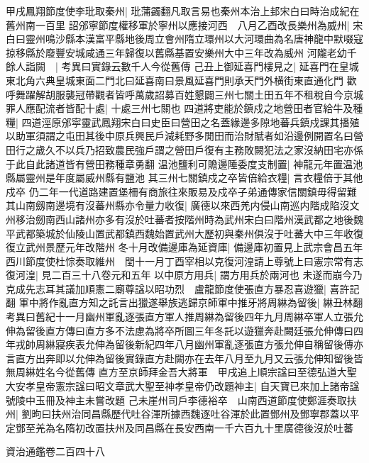 甲戌鳳翔節度使李玭取秦州|{
	玭蒲蠲翻凡取言易也秦州本治上邽宋白曰時治成紀在舊州南一百里}
詔邠寧節度權移軍於寧州以應接河西　八月乙酉改長樂州為威州|{
	宋白曰靈州鳴沙縣本漢富平縣地後周立會州隋立環州以大河環曲為名唐神龍中默啜寇掠移縣於廢豐安城咸通三年歸復以舊縣基置安樂州大中三年改為威州}
河隴老幼千餘人詣闕　|{
	考異曰實錄云數千人今從舊傳}
己丑上御延喜門樓見之|{
	延喜門在皇城東北角六典皇城東面二門北曰延喜南曰景風延喜門則承天門外横街東直通化門}
歡呼舞躍解胡服襲冠帶觀者皆呼萬歲詔募百姓懇闢三州七關土田五年不租稅自今京城罪人應配流者皆配十處|{
	十處三州七關也}
四道將吏能於鎮戍之地營田者官給牛及種糧|{
	四道涇原邠寜靈武鳳翔宋白曰史臣曰營田之名蓋緣邊多隙地蕃兵鎮戍課其播殖以助軍須謂之屯田其後中原兵興民戶減耗野多閒田而治財賦者如沿邊例開置名曰營田行之歲久不以兵乃招致農民強戶謂之營田戶復有主務敗闕犯法之家沒納田宅亦係于此自此諸道皆有營田務種章勇翻}
温池鹽利可贍邊陲委度支制置|{
	神龍元年置温池縣屬靈州是年度屬威州縣有鹽池}
其三州七關鎮戍之卒皆倍給衣糧|{
	言衣糧倍于其他戍卒}
仍二年一代道路建置堡柵有商旅往來販易及戍卒子弟通傳家信關鎮毋得留難其山南劔南邊境有沒蕃州縣亦令量力收復|{
	廣德以來西羌内侵山南巡内階成陷沒文州移治劒南西山諸州亦多有沒於吐蕃者按階州時為武州宋白曰階州漢武都之地後魏平武都築城於仙陵山置武都鎮西魏始置武州大歷初與秦州俱沒于吐蕃大中三年收復復立武州景歷元年改階州}
冬十月改備邊庫為延資庫|{
	備邊庫初置見上武宗會昌五年}
西川節度使杜悰奏取維州　閏十一月丁酉宰相以克復河湟請上尊號上曰憲宗常有志復河湟|{
	見二百三十八卷元和五年}
以中原方用兵|{
	謂方用兵於兩河也}
未遂而崩今乃克成先志耳其議加順憲二廟尊諡以昭功烈　盧龍節度使張直方暴忍喜遊獵|{
	喜許記翻}
軍中將作亂直方知之託言出獵遂舉族逃歸京師軍中推牙將周綝為留後|{
	綝丑林翻　考異曰舊紀十一月幽州軍亂逐張直方軍人推周綝為留後四年九月周綝卒軍人立張允伸為留後直方傳曰直方多不法慮為將卒所圖三年冬託以遊獵奔赴闕廷張允伸傳曰四年戎帥周綝寢疾表允伸為留後新紀四年八月幽州軍亂逐張直方張允伸自稱留後傳亦言直方出奔即以允伸為留後實錄直方赴闕亦在去年八月至九月又云張允伸知留後皆無周綝姓名今從舊傳}
直方至京師拜金吾大將軍　甲戌追上順宗諡曰至德弘道大聖大安孝皇帝憲宗諡曰昭文章武大聖至神孝皇帝仍改題神主|{
	自天寶已來加上諸帝諡號陵中玉冊及神主未嘗改題}
己未崖州司戶李德裕卒　山南西道節度使鄭涯奏取扶州|{
	劉昫曰扶州治同昌縣歷代吐谷渾所據西魏逐吐谷渾於此置鄧州及鄧寧郡蓋以平定鄧至羌為名隋初改置扶州及同昌縣在長安西南一千六百九十里廣德後沒於吐蕃}


資治通鑑卷二百四十八
